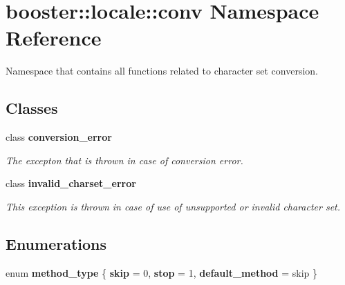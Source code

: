 \section{booster\+:\+:locale\+:\+:conv Namespace Reference}
\label{namespacebooster_1_1locale_1_1conv}


Namespace that contains all functions related to character set conversion.  


\subsection*{Classes}
\begin{DoxyCompactItemize}
\item 
class {\bf conversion\+\_\+error}
\begin{DoxyCompactList}\small\item\em The excepton that is thrown in case of conversion error. \end{DoxyCompactList}\item 
class {\bf invalid\+\_\+charset\+\_\+error}
\begin{DoxyCompactList}\small\item\em This exception is thrown in case of use of unsupported or invalid character set. \end{DoxyCompactList}\end{DoxyCompactItemize}
\subsection*{Enumerations}
\begin{DoxyCompactItemize}
\item 
enum {\bf method\+\_\+type} \{ {\bf skip} = 0, 
{\bf stop} = 1, 
{\bf default\+\_\+method} = skip
 \}
\end{DoxyCompactItemize}
